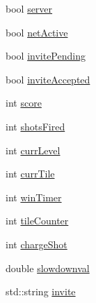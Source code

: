 \begin{DoxyCompactItemize}
bool \hyperlink{classTileGame_a8f1f5171595cb9819f47ad2c9849e810}{server}
\item 
bool \hyperlink{classTileGame_a475333f8fc083d4ea2fea31506834382}{net\-Active}
\item 
bool \hyperlink{classTileGame_ae23eafd71c3ecbccded93d7776c21445}{invite\-Pending}
\item 
bool \hyperlink{classTileGame_abeb262bc462d088865945f3bb4bff513}{invite\-Accepted}
\item 
int \hyperlink{classTileGame_abba0100f7c52d2a9ae1bfa0f5bbee4a5}{score}
\item 
int \hyperlink{classTileGame_a23df8d17a61584279dbec39ef31092cc}{shots\-Fired}
\item 
int \hyperlink{classTileGame_ade2ff1b55b30e055c67907574805c711}{curr\-Level}
\item 
int \hyperlink{classTileGame_a95f339ca3fee081b681bc04ca4db4b69}{curr\-Tile}
\item 
int \hyperlink{classTileGame_a05d9bbf0aebd4822ed518804eeb899fa}{win\-Timer}
\item 
int \hyperlink{classTileGame_a0a94db2f1d3da7a330e415d48c18e763}{tile\-Counter}
\item 
int \hyperlink{classTileGame_a1a8592c70c05bb2197c9b3cb0a33478e}{charge\-Shot}
\item 
double \hyperlink{classTileGame_a8b95ee0f509c6e7b170f392d755d2e59}{slowdownval}
\item 
std\-::string \hyperlink{classTileGame_a2aeaa1575631d37600e5c66bb2388a7b}{invite}
\end{DoxyCompactItemize}


